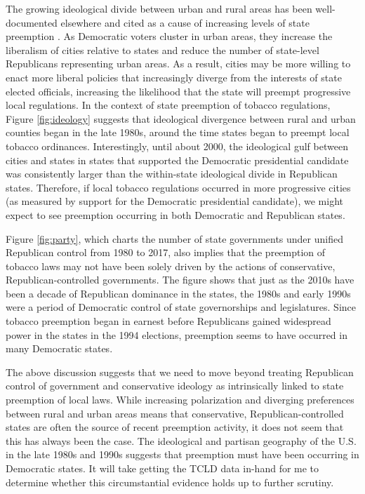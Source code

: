 \documentclass[12pt]{article}
\begin{document}
The growing ideological divide between urban and rural areas has been well-documented elsewhere \parencite[e.g.][]{chenUnintentionalGerrymanderingPolitical2013} and cited as a cause of increasing levels of state preemption \parencite{dupuisCityRightsEra2018,hicksHomeRuleBe2018}. As Democratic voters cluster in urban areas, they increase the liberalism of cities relative to states and reduce the number of state-level Republicans representing urban areas. As a result, cities may be more willing to enact more liberal policies that increasingly diverge from the interests of state elected officials, increasing the likelihood that the state will preempt progressive local regulations. In the context of state preemption of tobacco regulations, Figure \ref{fig:ideology} suggests that ideological divergence between rural and urban counties began in the late 1980s, around the time states began to preempt local tobacco ordinances. Interestingly, until about 2000, the ideological gulf between cities and states in states that supported the Democratic presidential candidate was consistently larger than the within-state ideological divide in Republican states. Therefore, if local tobacco regulations occurred in more progressive cities (as measured by support for the Democratic presidential candidate), we might expect to see preemption occurring in both Democratic and Republican states.


Figure \ref{fig:party}, which charts the number of state governments under unified Republican control from 1980 to 2017, also implies that the preemption of tobacco laws may not have been solely driven by the actions of conservative, Republican-controlled governments. The figure shows that just as the 2010s have been a decade of Republican dominance in the states, the 1980s and early 1990s were a period of Democratic control of state governorships and legislatures. Since tobacco preemption began in earnest before Republicans gained widespread power in the states in the 1994 elections, preemption seems to have occurred in many Democratic states. 

The above discussion suggests that we need to move beyond treating Republican control of government and conservative ideology as intrinsically linked to state preemption of local laws. While increasing polarization and diverging preferences between rural and urban areas means that conservative, Republican-controlled states are often the source of recent preemption activity, it does not seem that this has always been the case. The ideological and partisan geography of the U.S. in the late 1980s and 1990s suggests that preemption must have been occurring in Democratic states. It will take getting the TCLD data in-hand for me to determine whether this circumstantial evidence holds up to further scrutiny.
\end{document}
